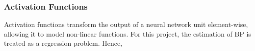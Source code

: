  \subsubsection{Activation Functions}
 Activation functions transform the output of a neural network unit element-wise, allowing it
to model non-linear functions. For this project, the estimation of BP is treated as a regression problem. 
Hence,

